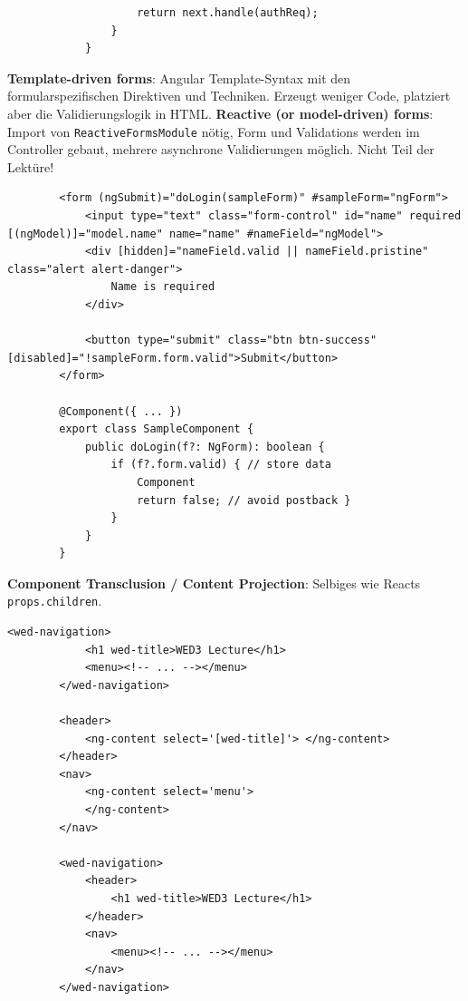 \documentclass[10pt,landscape]{article}
\begin{document}
\begin{multicols}{2}
\begin{lstlisting}
                    return next.handle(authReq);
                }
            }
        \end{lstlisting}

        \textbf{Template-driven forms}: Angular Template-Syntax mit den formularspezifischen Direktiven und Techniken.
        Erzeugt weniger Code, platziert aber die Validierungslogik in HTML.
        \textbf{Reactive (or model-driven) forms}: Import von \lstinline{ReactiveFormsModule} nötig, Form und Validations werden im Controller gebaut, mehrere asynchrone Validierungen möglich.
        Nicht Teil der Lektüre!

        \begin{lstlisting}
        <form (ngSubmit)="doLogin(sampleForm)" #sampleForm="ngForm">
            <input type="text" class="form-control" id="name" required [(ngModel)]="model.name" name="name" #nameField="ngModel">
            <div [hidden]="nameField.valid || nameField.pristine" class="alert alert-danger">
                Name is required
            </div>

            <button type="submit" class="btn btn-success" [disabled]="!sampleForm.form.valid">Submit</button>
        </form>

        @Component({ ... })
        export class SampleComponent {
            public doLogin(f?: NgForm): boolean {
                if (f?.form.valid) { // store data
                    Component
                    return false; // avoid postback }
                }
            }
        }
        \end{lstlisting}

        \textbf{Component Transclusion / Content Projection}: Selbiges wie Reacts \lstinline{props.children}.

        \begin{lstlisting}[belowskip=-0.8 \baselineskip]
        <wed-navigation>
            <h1 wed-title>WED3 Lecture</h1>
            <menu><!-- ... --></menu>
        </wed-navigation>

        <header>
            <ng-content select='[wed-title]'> </ng-content>
        </header>
        <nav>
            <ng-content select='menu'>
            </ng-content>
        </nav>

        <wed-navigation>
            <header>
                <h1 wed-title>WED3 Lecture</h1>
            </header>
            <nav>
                <menu><!-- ... --></menu>
            </nav>
        </wed-navigation>
        \end{lstlisting}


\end{multicols}
\end{document}
